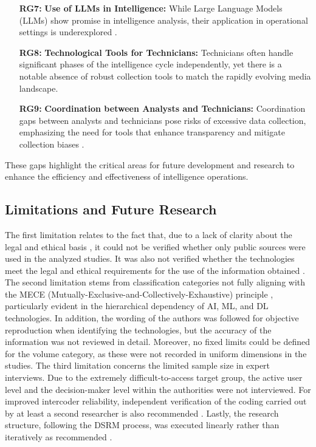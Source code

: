 \documentclass[10pt]{article}
\begin{document}
\begin{itemize}
    \item[\textbf{RG7:}] \textbf{Use of LLMs in Intelligence:} While Large Language Models (LLMs) show promise in intelligence analysis, their application in operational settings is underexplored \cite{Radford.2023,Zhao.31.03.2023}.
    
    \item[\textbf{RG8:}] \textbf{Technological Tools for Technicians:} Technicians often handle significant phases of the intelligence cycle independently, yet there is a notable absence of robust collection tools to match the rapidly evolving media landscape.
    
    \item[\textbf{RG9:}] \textbf{Coordination between Analysts and Technicians:} Coordination gaps between analysts and technicians pose risks of excessive data collection, emphasizing the need for tools that enhance transparency and mitigate collection biases \cite{Lowenthal.2020}.
\end{itemize}

These gaps highlight the critical areas for future development and research to enhance the efficiency and effectiveness of intelligence operations.


\subsection{Limitations and Future Research}

The first limitation relates to the fact that, due to a lack of clarity about the legal
and ethical basis \cite{Ghioni.2023,Unver.2018,Wittmer.2022},
it could not be verified whether only public sources \cite{NorthAtlanticTreatyOrganization.2002} were used
in the analyzed studies. It was also not verified whether the technologies meet the
legal and ethical requirements for the use of the information obtained
\cite{PastorGalindo.2020,Wittmer.2022}. The second
limitation stems from classification categories not fully aligning with the
MECE (Mutually-Exclusive-and-Collectively-Exhaustive) principle \cite{Lee.2018,Rasiel.1999},
particularly evident in the hierarchical dependency of AI, ML, and DL technologies. In addition,
the wording of the authors was followed for objective reproduction when identifying the technologies,
but the accuracy of the information was not reviewed in detail. Moreover, no fixed limits could be defined
for the volume category, as these were not recorded in uniform dimensions in the studies.
The third limitation concerns the limited sample size in expert interviews. Due to the
extremely difficult-to-access target group, the active user level and the decision-maker
level within the authorities were not interviewed. For improved intercoder reliability,
independent verification of the coding carried out by at least a second researcher
is also recommended \cite{Bogner.2002c,Glaser.2009}.
Lastly, the research structure, following the DSRM process, was executed linearly rather
than iteratively as recommended \cite{Peffers.2007}.
\end{document}
